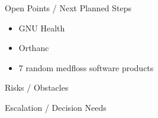 \documentclass[]{kiesgrube}
\begin{document}
\begin{poster}
\begin{posterbox}[name=open,column=1,below=description]{Open Points / Next Planned Steps}
\begin{itemize}
\item GNU Health
\item Orthanc
\item 7 random medfloss software products
\end{itemize}
\end{posterbox}
\begin{posterbox}[name=risks,column=1,below=open]{Risks / Obstacles}
\end{posterbox}
\begin{posterbox}[name=escalation,column=1,below=risks]{Escalation / Decision Needs}
\end{posterbox}


\end{poster}
\end{document}
